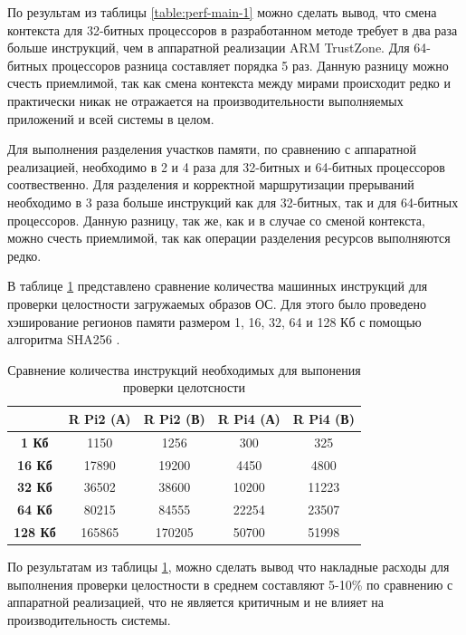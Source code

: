 По результам из таблицы \ref{table:perf-main-1} можно сделать вывод, что смена контекста для 32-битных процессоров в разработанном методе требует в два раза больше инструкций, чем в аппаратной реализации ARM TrustZone. Для 64-битных процессоров разница составляет порядка 5 раз. Данную разницу можно счесть приемлимой, так как смена контекста между мирами происходит редко и практически никак не отражается на производительности выполняемых приложений и всей системы в целом.

Для выполнения разделения участков памяти, по сравнению с аппаратной реализацией, необходимо в 2 и 4 раза для 32-битных и 64-битных процессоров соотвественно. Для разделения и корректной маршрутизации прерываний необходимо в 3 раза больше инструкций как для 32-битных, так и для 64-битных процессоров. Данную разницу, так же, как и в случае со сменой контекста, можно счесть приемлимой, так как операции разделения ресурсов выполняются редко.

В таблице \ref{table:perf-main-2} представлено сравнение количества машинных инструкций для проверки целостности загружаемых образов ОС. Для этого было проведено хэширование регионов памяти размером 1, 16, 32, 64 и 128 Кб с помощью алгоритма SHA256 \cite{sha-256}.

\begin{table}[!htb]
	\begin{center}
		\caption{Сравнение количества инструкций необходимых для выпонения проверки целотсности}
		\label{table:perf-main-2}
		\begin{tabular}{|c|c|c|c|c|}
			\hline
			& \bfseries R Pi2 (А) & \bfseries R Pi2 (В) & \bfseries R Pi4 (А) & \bfseries R Pi4 (В)\\
			\hline
			\bfseries 1 Кб & 1150 & 1256 & 300 & 325 \\ \hline
			\bfseries 16 Кб & 17890 & 19200 & 4450 & 4800 \\ \hline
			\bfseries 32 Кб  & 36502 & 38600 & 10200 & 11223 \\ \hline	
			\bfseries 64 Кб  & 80215 & 84555 & 22254 & 23507 \\ \hline	
			\bfseries 128 Кб  & 165865 & 170205 & 50700 & 51998 \\ \hline	
		\end{tabular}
	\end{center}
\end{table}

По результатам из таблицы \ref{table:perf-main-2}, можно сделать вывод что накладные расходы для выполнения проверки целостности в среднем составляют 5-10\% по сравнению с аппаратной реализацией, что не является критичным и не влияет на производительность системы.


